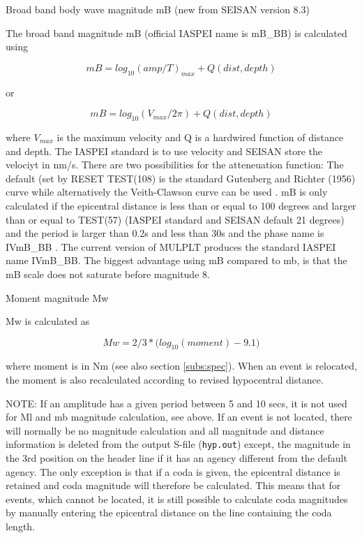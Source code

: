 Broad band body wave magnitude mB (new from SEISAN version 8.3)

The broad band magnitude mB (official IASPEI name is mB\_BB) is calculated using

\begin{displaymath}
   mB = log_{10}(amp/T)_{max} + Q(dist,depth)
\end{displaymath}

or 

\begin{displaymath}
   mB = log_{10}(V_{max}/2 \pi ) + Q(dist,depth)
\end{displaymath}


where  $V_{max}$ is the maximum velocity and Q is a hardwired function of 
distance and depth. The IASPEI standard is to use velocity and SEISAN 
store the velociyt in nm/s. There are two possibilities for the 
atteneuation function: The default (set by RESET TEST(108) is the 
standard Gutenberg and Richter (1956) curve while alternatively the 
Veith-Clawson curve can be used \citep{veith1972}. mB is 
only calculated if the epicentral distance is less than or equal to 
100 degrees and larger than or equal to TEST(57) (IASPEI standard 
and SEISAN default 21 degrees) and the period is larger than 0.2s 
and less than 30s and  the phase name is IVmB\_BB . The current 
version of MULPLT produces the standard IASPEI name  IVmB\_BB.  The 
biggest advantage using mB compared to mb, is that the mB scale 
does not saturate before magnitude 8. 

Moment magnitude Mw

Mw is calculated as

\begin{displaymath}
Mw = 2/3 * \Big( log_{10}(moment) - 9.1 \Big)
\end{displaymath}

where moment is in Nm (see also section \ref{subs:spec}). When an event is 
relocated, the moment is also 
recalculated according to revised hypocentral distance.

NOTE: If an amplitude has a given period between 5 and 10 secs, it 
is not used for Ml and mb magnitude calculation, see above. If an 
event is not located, there will normally be no magnitude calculation 
and all magnitude and distance information is deleted from the output 
S-file (\texttt{hyp.out}) except, the magnitude in the 3rd position on the 
header line if it has an agency different from the default agency. 
The only exception is that if a coda is given, the epicentral distance 
is retained and coda magnitude will therefore be calculated. This 
means that for events, which cannot be located, it is still possible 
to calculate coda magnitudes by manually entering the epicentral 
distance on the line containing the coda length.

